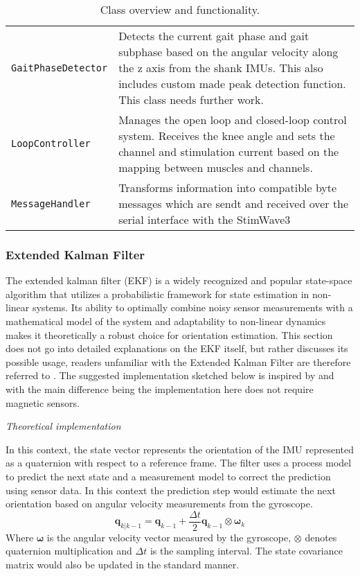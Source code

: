\begin{table}[H]
\begin{tcolorbox}
\begin{tabular}{p{} | p{}}
\texttt{GaitPhaseDetector} & Detects the current gait phase and gait subphase based on the angular velocity along the z axis from the shank IMUs. This also includes custom made peak detection function. This class needs further work. \\

\texttt{LoopController} & Manages the open loop and closed-loop control system. Receives the knee angle and sets the channel and stimulation current based on the mapping between muscles and channels. \\

\texttt{MessageHandler} & Transforms information into compatible byte messages which are sendt and received over the serial interface with the StimWave3 \\
\end{tabular}
\end{tcolorbox}
\caption{Class overview and functionality.}
\label{tab:class-overview}
\end{table}


\subsubsection{Extended Kalman Filter}

The extended kalman filter (EKF) is a widely recognized and popular state-space algorithm that utilizes a probabilistic framework for state estimation in non-linear systems. Its ability to optimally combine noisy sensor measurements with a mathematical model of the system and adaptability to non-linear dynamics makes it theoretically a robust choice for orientation estimation. This section does not go into detailed explanations on the EKF itself, but rather discusses its possible usage, readers unfamiliar with the Extended Kalman Filter are therefore referred to . The suggested implementation sketched below is inspired by \cite{sabatini_kalman-filter-based_2011} and \cite{noauthor_extended_nodate} with the main difference being the implementation here does not require magnetic sensors.


\textit{Theoretical implementation}

In this context, the state vector represents the orientation of the IMU represented as a quaternion with respect to a reference frame. The filter uses a process model to predict the next state and a measurement model to correct the prediction using sensor data. In this context the prediction step would estimate the next orientation based on angular velocity measurements from the gyroscope.
\[
\mathbf{q}_{k|k-1} = \mathbf{q}_{k-1} + \frac{\Delta t}{2} \mathbf{q}_{k-1} \otimes \mathbf{\omega}_k
\]
Where \( \mathbf{\omega} \) is the angular velocity vector measured by the gyroscope, \( \otimes \) denotes quaternion multiplication and \( \Delta t \) is the sampling interval. The state covariance matrix would also be updated in the standard manner.

